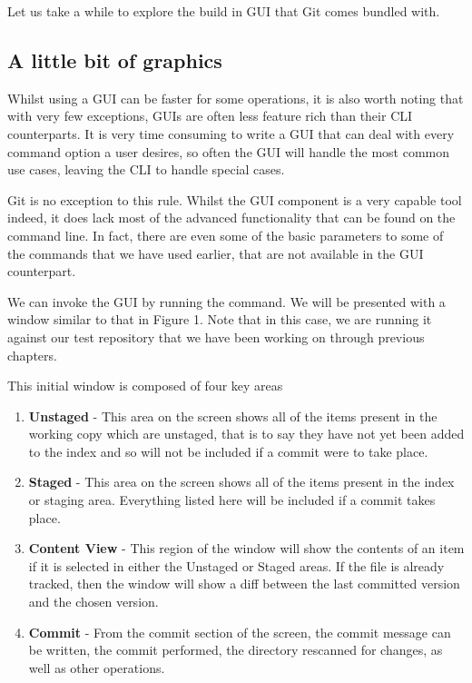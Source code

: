 Let us take a while to explore the build in GUI that Git comes bundled with.

\subsection{A little bit of graphics}
Whilst using a GUI can be faster for some operations, it is also worth noting that with very few exceptions, GUIs are often less feature rich than their CLI counterparts.
It is very time consuming to write a GUI that can deal with every command option a user desires, so often the GUI will handle the most common use cases, leaving the CLI to handle special cases.

Git is no exception to this rule.
Whilst the GUI component is a very capable tool indeed, it does lack most of the advanced functionality that can be found on the command line.
In fact, there are even some of the basic parameters to some of the commands that we have used earlier, that are not available in the GUI counterpart.

We can invoke the GUI by running the  command.
We will be presented with a window similar to that in Figure 1.
Note that in this case, we are running it against our test repository that we have been working on through previous chapters.


This initial window is composed of four key areas
\begin{enumerate}
\item \textbf{Unstaged} - This area on the screen shows all of the items present in the working copy which are unstaged, that is to say they have not yet been added to the index and so will not be included if a commit were to take place.
\item \textbf{Staged} - This area on the screen shows all of the items present in the index or staging area.
Everything listed here will be included if a commit takes place.
\item \textbf{Content View} - This region of the window will show the contents of an item if it is selected in either the Unstaged or Staged areas.
If the file is already tracked, then the window will show a diff between the last committed version and the chosen version.
\item \textbf{Commit} - From the commit section of the screen, the commit message can be written, the commit performed, the directory rescanned for changes, as well as other operations.
\end{enumerate}


